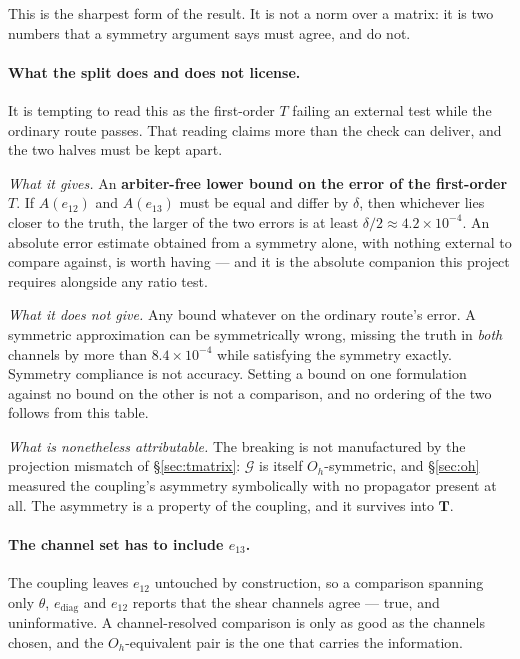 \documentclass[11pt,a4paper]{article}
\newcommand{\Oh}{O_{h}}
\begin{document}
This is the sharpest form of the result.  It is not a norm over a matrix: it is
two numbers that a symmetry argument says must agree, and do not.

\paragraph{What the split does and does not license.}  It is tempting to read
this as the first-order $T$ failing an external test while the ordinary route
passes.  That reading claims more than the check can deliver, and the two halves
must be kept apart.

\emph{What it gives.}  An \textbf{arbiter-free lower bound on the error of the
first-order $T$}.  If $A(e_{12})$ and $A(e_{13})$ must be equal and differ by
$\delta$, then whichever lies closer to the truth, the larger of the two errors
is at least $\delta/2 \approx 4.2\times10^{-4}$.  An absolute error estimate
obtained from a symmetry alone, with nothing external to compare against, is
worth having --- and it is the absolute companion this project requires
alongside any ratio test.

\emph{What it does not give.}  Any bound whatever on the ordinary route's error.
A symmetric approximation can be symmetrically wrong, missing the truth in
\emph{both} channels by more than $8.4\times10^{-4}$ while satisfying the
symmetry exactly.  Symmetry compliance is not accuracy.  Setting a bound on one
formulation against no bound on the other is not a comparison, and no ordering
of the two follows from this table.

\emph{What is nonetheless attributable.}  The breaking is not manufactured by
the projection mismatch of \S\ref{sec:tmatrix}: $\mathcal{G}$ is itself
$\Oh$-symmetric, and \S\ref{sec:oh} measured the coupling's asymmetry
symbolically with no propagator present at all.  The asymmetry is a property of
the coupling, and it survives into $\mathbf{T}$.

\paragraph{The channel set has to include $e_{13}$.}  The coupling leaves
$e_{12}$ untouched by construction, so a comparison spanning only $\theta$,
$e_{\text{diag}}$ and $e_{12}$ reports that the shear channels agree --- true,
and uninformative.  A channel-resolved comparison is only as good as the
channels chosen, and the $\Oh$-equivalent pair is the one that carries the
information.
\end{document}
